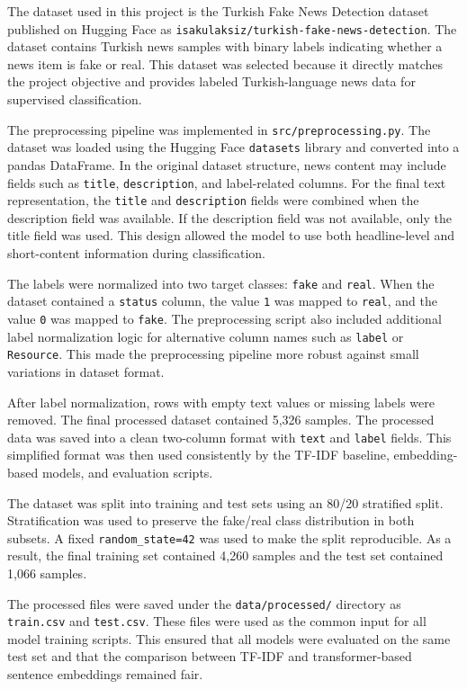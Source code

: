 \documentclass[11pt]{article}
\begin{document}
The dataset used in this project is the Turkish Fake News Detection dataset published on Hugging Face as \texttt{isakulaksiz/turkish-fake-news-detection}. The dataset contains Turkish news samples with binary labels indicating whether a news item is fake or real. This dataset was selected because it directly matches the project objective and provides labeled Turkish-language news data for supervised classification.

The preprocessing pipeline was implemented in \texttt{src/preprocessing.py}. The dataset was loaded using the Hugging Face \texttt{datasets} library and converted into a pandas DataFrame. In the original dataset structure, news content may include fields such as \texttt{title}, \texttt{description}, and label-related columns. For the final text representation, the \texttt{title} and \texttt{description} fields were combined when the description field was available. If the description field was not available, only the title field was used. This design allowed the model to use both headline-level and short-content information during classification.

The labels were normalized into two target classes: \texttt{fake} and \texttt{real}. When the dataset contained a \texttt{status} column, the value \texttt{1} was mapped to \texttt{real}, and the value \texttt{0} was mapped to \texttt{fake}. The preprocessing script also included additional label normalization logic for alternative column names such as \texttt{label} or \texttt{Resource}. This made the preprocessing pipeline more robust against small variations in dataset format.

After label normalization, rows with empty text values or missing labels were removed. The final processed dataset contained 5,326 samples. The processed data was saved into a clean two-column format with \texttt{text} and \texttt{label} fields. This simplified format was then used consistently by the TF-IDF baseline, embedding-based models, and evaluation scripts.

The dataset was split into training and test sets using an 80/20 stratified split. Stratification was used to preserve the fake/real class distribution in both subsets. A fixed \texttt{random\_state=42} was used to make the split reproducible. As a result, the final training set contained 4,260 samples and the test set contained 1,066 samples.

The processed files were saved under the \texttt{data/processed/} directory as \texttt{train.csv} and \texttt{test.csv}. These files were used as the common input for all model training scripts. This ensured that all models were evaluated on the same test set and that the comparison between TF-IDF and transformer-based sentence embeddings remained fair.
\end{document}
